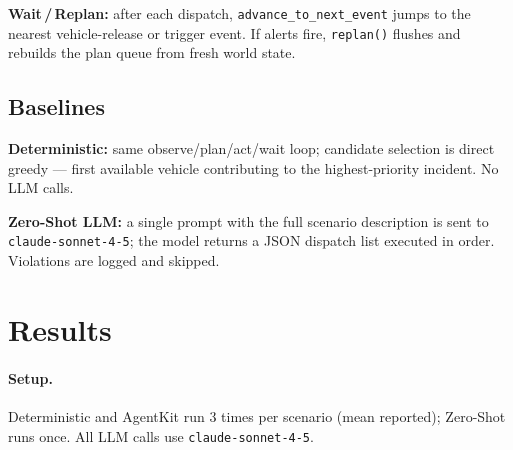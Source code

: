 \documentclass{article}
\begin{document}
\textbf{Wait\,/\,Replan:} after each dispatch, \texttt{advance\_to\_next\_event}
jumps to the nearest vehicle-release or trigger event.
If alerts fire, \texttt{replan()} flushes and rebuilds the plan queue from
fresh world state.

\subsection{Baselines}

\textbf{Deterministic:} same observe/plan/act/wait loop; candidate
selection is direct greedy --- first available vehicle contributing to
the highest-priority incident.  No LLM calls.

\textbf{Zero-Shot LLM:} a single prompt with the full scenario description
is sent to \texttt{claude-sonnet-4-5}; the model returns a JSON dispatch
list executed in order.  Violations are logged and skipped.

\section{Results}
\label{sec:results}

\paragraph{Setup.}
Deterministic and AgentKit run 3 times per scenario (mean reported);
Zero-Shot runs once.  All LLM calls use \texttt{claude-sonnet-4-5}.
\end{document}
